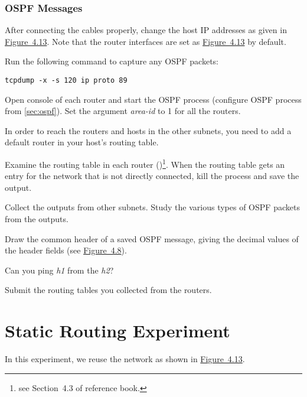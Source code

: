 \documentclass{../UTNetLab}
\begin{document}
\section{OSPF Messages}
After connecting the cables properly, change the host IP addresses as given in \hyperref[fig:4.13]{Figure~4.13}.
Note that the router interfaces are set as \hyperref[fig:4.13]{Figure~4.13} by default.

Run the following command to capture any OSPF packets:
\begin{lstlisting}[morekeywords={[3]ip,proto}]
tcpdump -x -s 120 ip proto 89
    \end{lstlisting}

Open console of each router and start the OSPF process (configure OSPF process from \autoref{sec:ospf}).
Set the argument \textit{area-id} to 1 for all the routers.

In order to reach the routers and hosts in the other subnets, you need to add a default router in your host’s routing table.

Examine the routing table in each router ()\footnote{see Section~4.3 of reference book.}.
When the routing table gets an entry for the network that is not directly connected, kill the  process and save the  output.

Collect the  outputs from other subnets.
Study the various types of OSPF packets from the  outputs.

\begin{report}
    \item Draw the common header of a saved OSPF message, giving the decimal values of the header fields (see \hyperref[fig:4.8]{Figure~4.8}).

    \item Can you ping \textit{h1} from the \textit{h2}?

    \item Submit the routing tables you collected from the routers.
\end{report}

\part{Static Routing Experiment}\label{sec:static}
In this experiment, we reuse the network as shown in \hyperref[fig:4.13]{Figure~4.13}.
\end{document}
